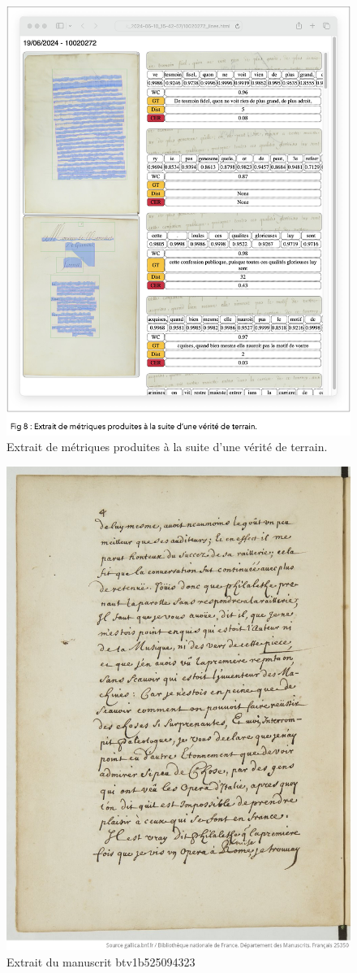 \documentclass[a4paper,12pt,twoside]{book}
\begin{document}
\begin{figure}
	\centering
	\includegraphics[width=0.7\linewidth]{images/verit_ter}
	\caption{Extrait de métriques produites à la suite d’une vérité de terrain.}
	\label{fig:veritter}
\end{figure}

\begin{figure}
	\centering
	\includegraphics[width=0.7\linewidth]{images/mss_bnf_ex_1}
	\caption{Extrait du manuscrit btv1b525094323}
	\label{fig:mssbnfex1}
\end{figure}
\end{document}
